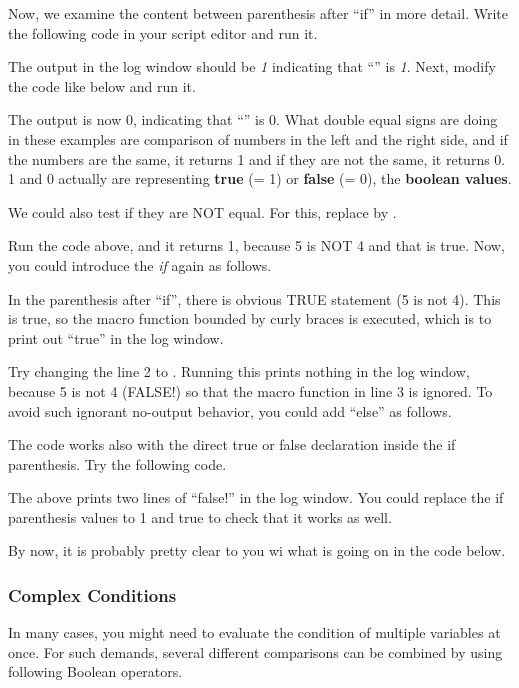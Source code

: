 Now, we examine the content between 
parenthesis after ``if'' in more detail. 
Write the following code in your script editor and run it.

The output in the log window should be \textit{1} indicating that ``'' is \textit{1}. Next, modify the code like below and run it.

The output is now 0, indicating that ``'' is
0.
What double equal signs \ilcom{==} are doing in these
examples are comparison of numbers in the left and the right side, and if
the numbers are the same, it returns 1 and if they are not the same, it returns 0. 1 and
0 actually are representing \textbf{true} (= 1) or \textbf{false} (= 0), the
\textbf{boolean values}.

We could also test if they are NOT equal. For this, replace \ilcom{==} by
\ilcom{!=}.

Run the code above, and it returns 1, because 5 is NOT 4 and that is true. Now,
you could introduce the \textit{if} again as follows.

In the parenthesis after ``if'', there is obvious TRUE statement (5 is not 4).
This is true, so the macro function bounded by curly braces is executed, which is to
print out ``true'' in the log window.

Try changing the line 2 to . Running this prints nothing
in the log window, because 5 is not 4 (FALSE!) so that the macro function in
line 3 is ignored. To avoid such ignorant no-output behavior, you could add
``else'' as follows.



The code works also with the direct true or false
declaration inside the if parenthesis. Try the following code.



The above prints two lines of ``false!'' in the log window. You could replace
the if parenthesis values to 1 and true to check that it works as well. 

By now, it is probably pretty clear to you wi what is going on in the code below. 


\subsubsection{Complex Conditions}
In many cases, you might need to evaluate the condition of multiple variables at once. 
For such demands, several different comparisons can be combined by using following Boolean operators. 

